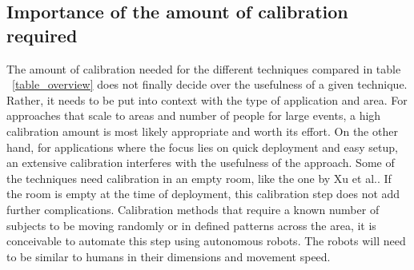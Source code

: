 \documentclass[conference]{IEEEtran}
\begin{document}
\subsection{Importance of the amount of calibration required}
The amount of calibration needed for the different techniques compared in table ~\ref{table_overview} does not finally decide over the usefulness of a given technique. Rather, it needs to be put into context with the type of application and area. For approaches that scale to areas and number of people for large events, a high calibration amount is most likely appropriate and worth its effort. On the other hand, for applications where the focus lies on quick deployment and easy setup, an extensive calibration interferes with the usefulness of the approach. Some of the techniques need calibration in an empty room, like the one by Xu et al.\cite{Xu}. If the room is empty at the time of deployment, this calibration step does not add further complications. Calibration methods that require a known number of subjects to be moving randomly or in defined patterns across the area, it is conceivable to automate this step using autonomous robots. The robots will need to be similar to humans in their dimensions and movement speed.
\end{document}
